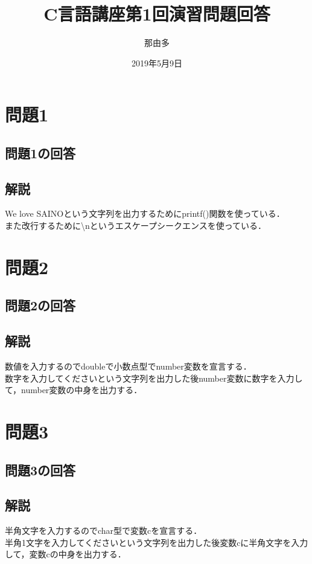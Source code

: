 \documentclass[a4j,titlepage,dvipdfmx]{jsarticle}   %
\title{C言語講座第1回演習問題回答}
\author{那由多}
\date{2019年5月9日}
\newcommand{\codepath}{./code/01_Answer}
\begin{document}
\maketitle
\section{問題1}
\subsection{問題1の回答}

\subsection{解説}
We love SAINOという文字列を出力するためにprintf()関数を使っている．\\
また改行するために\textbackslash nというエスケープシークエンスを使っている．\\

\section{問題2}
\subsection{問題2の回答}

\subsection{解説}
数値を入力するのでdoubleで小数点型でnumber変数を宣言する．\\
数字を入力してくださいという文字列を出力した後number変数に数字を入力して，number変数の中身を出力する．\\

\section{問題3}
\subsection{問題3の回答}

\subsection{解説}
半角文字を入力するのでchar型で変数cを宣言する．\\
半角1文字を入力してくださいという文字列を出力した後変数cに半角文字を入力して，変数cの中身を出力する．\\
\end{document}

